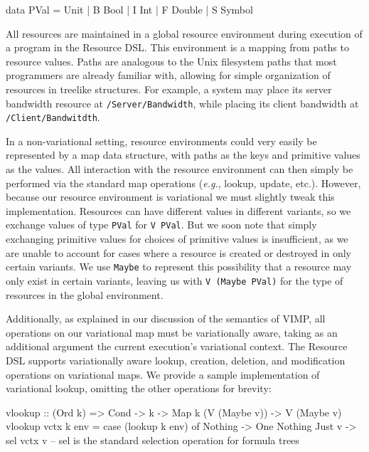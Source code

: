 \documentclass[letterpaper,10pt,onecolumn]{article}
\newcommand{\prog}[1]{{\small\texttt{#1}}}
\begin{document}
\begin{program}
data PVal
     = Unit
     | B Bool
     | I Int
     | F Double
     | S Symbol
\end{program}

All resources are maintained in a global resource environment during execution of a program
in the Resource DSL. This environment is a mapping from paths to resource values. Paths are
analogous to the Unix filesystem paths that most programmers are already familiar with, allowing for
simple organization of resources in treelike structures. For example, a system may place its server
bandwidth resource at \prog{/Server/Bandwidth}, while placing its client bandwidth at \prog{/Client/Bandwitdth}.

In a non-variational setting, resource environments could very easily be represented by a map data structure,
with paths as the keys and primitive values as the values. All interaction with the resource environment can then
simply be performed via the standard map operations (\emph{e.g.}, lookup, update, etc.). However, because our resource environment
is variational we must slightly tweak this implementation. Resources can have different values in different
variants, so we exchange values of type \prog{PVal} for \prog{V PVal}. But we soon note that simply exchanging primitive values
for choices of primitive values is insufficient, as we are unable to
account for cases where a resource is created or destroyed in only certain variants. We use \prog{Maybe} to represent this possibility
that a resource may only exist in certain variants, leaving us with \prog{V (Maybe PVal)} for the type of resources in the global environment.

Additionally, as explained in our discussion of the semantics of VIMP, all operations on our variational map must be variationally aware,
taking as an additional argument the current execution's variational context. The Resource DSL supports variationally aware lookup,
creation, deletion, and modification operations on variational maps. We provide a sample implementation of variational lookup, omitting
the other operations for brevity:

\begin{program}
vlookup :: (Ord k) => Cond -> k -> Map k (V (Maybe v)) -> V (Maybe v)
vlookup vctx k env = case (lookup k env) of
    Nothing -> One Nothing
    Just v -> sel vctx v  -- sel is the standard selection operation for formula trees
\end{program}
\end{document}
